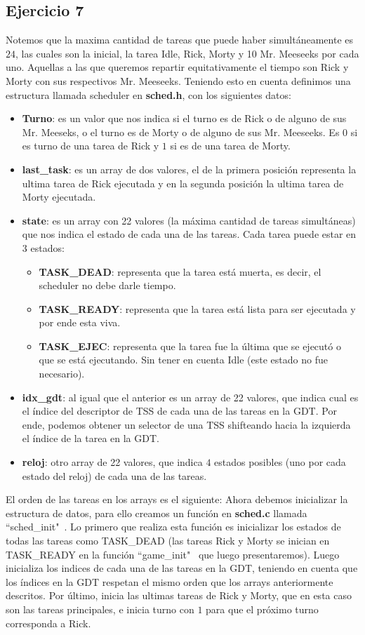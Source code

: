 \documentclass[a4paper]{article}
\begin{document}
\subsection{Ejercicio 7}
\justify
Notemos que la maxima cantidad de tareas que puede haber simultáneamente es $24$, las cuales son la inicial, la tarea Idle, Rick, Morty y 10 Mr. Meeseeks por cada uno. Aquellas a las que queremos repartir equitativamente el tiempo son Rick y Morty con sus respectivos Mr. Meeseeks. Teniendo esto en cuenta definimos una estructura llamada scheduler en \textbf{sched.h}, con los siguientes datos:
\begin{itemize}
	\item \textbf{Turno}: es un valor que nos indica si el turno es de Rick o de alguno de sus Mr. Meeseks, o el turno es de Morty o de alguno de sus Mr. Meeseeks. Es $0$ si es turno de una tarea de Rick y $1$ si es de una tarea de Morty.
	\item \textbf{last_task}: es un array de dos valores, el de la primera posición representa la ultima tarea de Rick ejecutada y en la segunda posición la ultima tarea de Morty ejecutada.
	\item \textbf{state}: es un array con 22 valores (la máxima cantidad de tareas simultáneas) que nos indica el estado de cada una de las tareas. Cada tarea puede estar en $3$ estados:
	\begin{itemize}
		\item \textbf{TASK_DEAD}: representa que la tarea está muerta, es decir, el scheduler no debe darle tiempo.
		\item \textbf{TASK_READY}: representa que la tarea está lista para ser ejecutada y por ende esta viva.
		\item \textbf{TASK_EJEC}: representa que la tarea fue la última que se ejecutó o que se está ejecutando. Sin tener en cuenta Idle (este estado no fue necesario).
	\end{itemize} 
	\item \textbf{idx_gdt}: al igual que el anterior es un array de 22 valores, que indica cual es el índice del descriptor de TSS de cada una de las tareas en la GDT. Por ende, podemos obtener un selector de una TSS shifteando hacia la izquierda el índice de la tarea en la GDT.
	\item \textbf{reloj}: otro array de 22 valores, que indica $4$ estados posibles (uno por cada estado del reloj) de cada una de las tareas.   
\end{itemize}
El orden de las tareas en los arrays es el siguiente:
\justify
Ahora debemos inicializar la estructura de datos, para ello creamos un función en \textbf{sched.c} llamada ``sched_init"\ . Lo primero que realiza esta función es inicializar los estados de todas las tareas como TASK_DEAD (las tareas Rick y Morty se inician en TASK_READY en la función ``game_init" \ que luego presentaremos). Luego inicializa los indices de cada una de las tareas en la GDT, teniendo en cuenta que los índices en la GDT respetan el mismo orden que los arrays anteriormente descritos. Por último, inicia las ultimas tareas de Rick y Morty, que en esta caso son las tareas principales, e inicia turno con $1$ para que el próximo turno corresponda a Rick.
\end{document}
